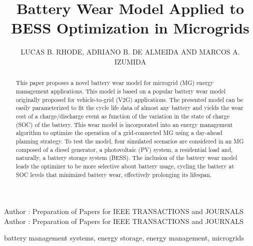 \documentclass{ieeeaccess}
\begin{document}

\title{Battery Wear Model Applied to BESS Optimization in Microgrids}

\author{
	\uppercase{Lucas B. Rhode},
	\uppercase{Adriano B. de Almeida}
	\uppercase{and Marcos A. Izumida}
}
\address[1]{Sustainable Energies Center, CERTI Foundation, Brazil (e-mail: lrh@certi.org.br)}
\address[2]{Western Parana State University, Brazil (e-mail: adriano.almeida@unioeste.br)}
\address[3]{Sustainable Energies Center, CERTI Foundation, Brazil (e-mail: mlz@certi.org.br)}

\markboth
{Author \headeretal: Preparation of Papers for IEEE TRANSACTIONS and JOURNALS}
{Author \headeretal: Preparation of Papers for IEEE TRANSACTIONS and JOURNALS}


\begin{abstract}
    This paper proposes a novel battery wear model for microgrid (MG) energy management applications. This model is based on a popular battery wear model originally proposed for vehicle-to-grid (V2G) applications. The presented model can be easily parameterized to fit the cycle life data of almost any battery and yields the wear cost of a charge/discharge event as function of the variation in the state of charge (SOC) of the battery. This wear model is incorporated into an energy management algorithm to optimize the operation of a grid-connected MG using a day-ahead planning strategy. To test the model, four simulated scenarios are considered in an MG composed of a diesel generator, a photovoltaic (PV) system, a residential load and, naturally, a battery storage system (BESS). The inclusion of the battery wear model leads the optimizer to be more selective about battery usage, cycling the battery at SOC levels that minimized battery wear, effectively prolonging its lifespan.
\end{abstract}

\begin{keywords}
    battery management systems, energy storage, energy management, microgrids
\end{keywords}

\titlepgskip=-15pt

\maketitle
\end{document}

